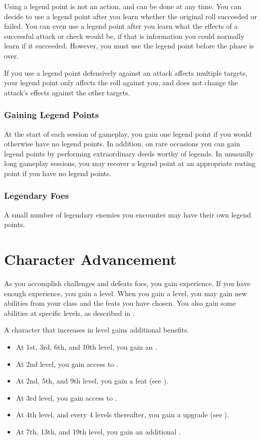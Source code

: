         Using a legend point is not an action, and can be done at any time.
        You can decide to use a legend point after you learn whether the original roll succeeded or failed.
        You can even use a legend point after you learn what the effects of a successful attack or check would be, if that is information you could normally learn if it succeeded.
        However, you must use the legend point before the phase is over.

        If you use a legend point defensively against an attack affects multiple targets, your legend point only affects the roll against you, and does not change the attack's effects against the other targets.

    \subsubsection{Gaining Legend Points}
        At the start of each session of gameplay, you gain one legend point if you would otherwise have no legend points.
        In addition, on rare occasions you can gain legend points by performing extraordinary deeds worthy of legends.
        In unusually long gameplay sessions, you may recover a legend point at an appropriate resting point if you have no legend points.

    \subsubsection{Legendary Foes}
        A small number of legendary enemies you encounter may have their own legend points.

\section{Character Advancement}\label{Character Advancement}

    As you accomplish challenges and defeats foes, you gain experience.
    If you have enough experience, you gain a level.
    When you gain a level, you may gain new abilities from your class and the feats you have chosen.
    You also gain some abilities at specific levels, as described in .

    A character that increases in level gains additional benefits.
    \begin{itemize}
        \item At 1st, 3rd, 6th, and 10th level, you gain an .
        \item At 2nd level, you gain access to .
        \item At 2nd, 5th, and 9th level, you gain a feat (see ).
        \item At 3rd level, you gain access to .
        \item At 4th level, and every 4 levels thereafter, you gain a  upgrade (see ).
        \item At 7th, 13th, and 19th level, you gain an additional .
    \end{itemize}

